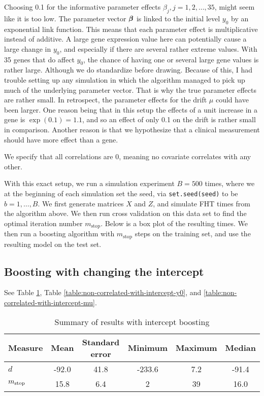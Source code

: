 Choosing 0.1 for the informative parameter effects $\beta_j,j=1,2,\ldots,35$, might seem like it is too low.
The parameter vector $\boldsymbol{\beta}$ is linked to the initial level $y_0$ by an exponential link function.
This means that each parameter effect is multiplicative instead of additive.
A large gene expression value here can potentially cause a large change in $y_0$, and especially if there are several rather extreme values.
With 35 genes that do affect $y_0$, the chance of having one or several large gene values is rather large.
Although we do standardize before drawing.
Because of this, I had trouble setting up any simulation in which the algorithm managed to pick up much of the underlying parameter vector.
That is why the true parameter effects are rather small.
In retrospect, the parameter effects for the drift $\mu$ could have been larger.
One reason being that in this setup the effects of a unit increase in a gene is $\exp(0.1)=1.1$, and so an effect of only 0.1 on the drift is rather small in comparison.
Another reason is that we hypothesize that a clinical measurement should have more effect than a gene.

We specify that all correlations are 0, meaning no covariate correlates with any other.

With this exact setup, we run a simulation experiment $B=500$ times, where we at the beginning of each simulation set the seed, via \verb|set.seed(seed)| to be $b=1,\ldots,B$.
We first generate matrices $X$ and $Z$, and simulate FHT times from the algorithm above.
We then run cross validation on this data set to find the optimal iteration number $m_{\text{stop}}$.
Below is a box plot of the resulting times. We then run a boosting algorithm with $m_{\text{stop}}$ steps on the training set, and use the resulting model on the test set.

\subsection{Boosting with changing the intercept}
See Table \ref{table:non-correlated-with-intercept-summary}, Table \ref{table:non-correlated-with-intercept-y0}, and \ref{table:non-correlated-with-intercept-mu}.
\begin{table}\caption{Summary of results with intercept boosting}\label{table:non-correlated-with-intercept-summary}
\centering
\begin{tabular}{lccccc}
\toprule
Measure &   Mean & Standard error &  Minimum &    Maximum & Median \\
\hline
$d$    &    -92.0 & 41.8 &  -233.6   &  7.2 &  -91.4 \\
$m_{\text{stop}}$      &    15.8 &  6.4 &     2 &    39 & 16.0\\
\bottomrule
\end{tabular}
\end{table}


